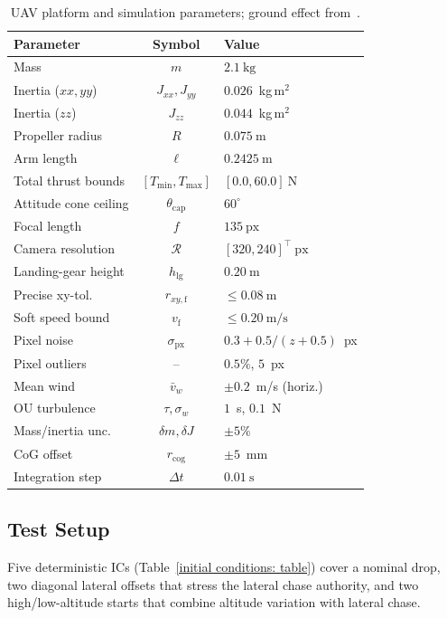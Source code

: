 \begin{table}[!t]
\centering
\caption{UAV platform and simulation parameters; ground effect from~\cite{sanchez-cuevas2017}.}
\label{uav params: table}
\begin{tabular}{lcl}
\toprule
\textbf{Parameter} & \textbf{Symbol} & \textbf{Value} \\
\midrule
Mass                & $m$                    & $2.1~\text{kg}$ \\
Inertia ($xx,yy$)    & $J_{xx},J_{yy}$        & $0.026$~kg\,m$^2$ \\
Inertia ($zz$)        & $J_{zz}$               & $0.044$~kg\,m$^2$ \\
Propeller radius    & $R$                    & $0.075~\text{m}$ \\
Arm length          & $\ell$                 & $0.2425~\text{m}$ \\
Total thrust bounds & $[T_{\min},T_{\max}]$  & $[0.0,60.0]~\text{N}$ \\
Attitude cone ceiling & $\theta_\text{cap}$   & $60^\circ$ \\
Focal length        & $f$                    & $135~\text{px}$ \\
Camera resolution   & $\mathcal{R}$          & $[320,240]^\top~\text{px}$ \\
Landing-gear height & $h_\text{lg}$ & $0.20~\text{m}$ \\
Precise xy-tol.     & $r_{xy,\text{f}}$ & $\le 0.08~\text{m}$ \\
Soft speed bound    & $v_\text{f}$      & $\le 0.20~\text{m/s}$ \\
Pixel noise          & $\sigma_\text{px}$     & $0.3{+}0.5/(z{+}0.5)$~px \\
Pixel outliers       & --                     & $0.5\%$, $5$~px \\
Mean wind            & $\bar{v}_w$            & $\pm 0.2$~m/s (horiz.) \\
OU turbulence        & $\tau,\sigma_w$        & $1$~s, $0.1$~N \\
Mass/inertia unc.    & $\delta m,\delta J$    & $\pm 5\%$ \\
CoG offset           & $r_\text{cog}$         & $\pm 5$~mm \\
Integration step    & $\Delta t$             & $0.01~\text{s}$ \\
\bottomrule
\end{tabular}
\end{table}

\subsection{Test Setup}
\label{test conditions: subsec}
Five deterministic ICs (Table~\ref{initial conditions: table}) cover a nominal drop, two diagonal lateral offsets that stress the lateral chase authority, and two high/low-altitude starts that combine altitude variation with lateral chase.

